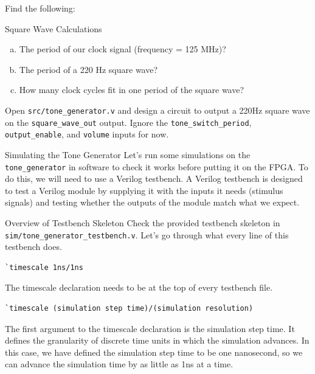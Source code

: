 \documentclass[11pt]{article}
\makeatletter
\renewcommand{\section}
{\@startsection {section}{1}{0pt}
 {-2ex}
 {1ex}
 {\bfseries\Large}}
\renewcommand{\subsection}
{\@startsection {subsection}{1}{0pt}
 {-1ex}
 {0.5ex}
 {\bfseries\normalsize}}
\makeatother
\begin{document}
Find the following:
\begin{texexptitled}{Square Wave Calculations}{}
\begin{enumerate}[a)]
\item The period of our clock signal (frequency = 125 MHz)?
\item The period of a 220 Hz square wave?
\item How many clock cycles fit in one period of the square wave?
\end{enumerate}
\end{texexptitled}

Open \verb|src/tone_generator.v| and design a circuit to output a 220Hz square wave on the \verb|square_wave_out| output.
Ignore the \verb|tone_switch_period|, \verb|output_enable|, and \verb|volume| inputs for now.

\section{Simulating the Tone Generator}
Let's run some simulations on the \verb|tone_generator| in software to check it works before putting it on the FPGA.
To do this, we will need to use a Verilog testbench.
A Verilog testbench is designed to test a Verilog module by supplying it with the inputs it needs (stimulus signals) and testing whether the outputs of the module match what we expect.

\subsection{Overview of Testbench Skeleton}
Check the provided testbench skeleton in \verb|sim/tone_generator_testbench.v|.
Let's go through what every line of this testbench does.

\begin{verbatim}
`timescale 1ns/1ns
\end{verbatim}

The timescale declaration needs to be at the top of every testbench file.
\begin{verbatim}
`timescale (simulation step time)/(simulation resolution)
\end{verbatim}

The first argument to the timescale declaration is the simulation step time.
It defines the granularity of discrete time units in which the simulation advances.
In this case, we have defined the simulation step time to be one nanosecond, so we can advance the simulation time by as little as 1ns at a time.
\end{document}

